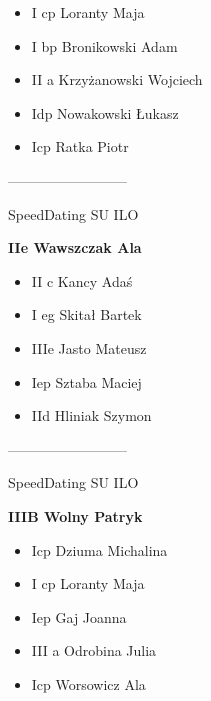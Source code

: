 \documentclass[a4paper,10pt]{article}
\begin{document}
\begin{multicols}{3}
\begin{minipage}[l]{\textwidth}
  \begin{itemize}
    \item I cp Loranty Maja
    \item I bp Bronikowski Adam
    \item II a Krzyżanowski Wojciech
    \item Idp Nowakowski Łukasz
    \item Icp Ratka Piotr

    \end{itemize}



\end{minipage}



\begin{minipage}[l]{\textwidth}
--------------------------

  \footnotesize{SpeedDating SU ILO}

  \bfseries{IIe Wawszczak Ala}

  \begin{itemize}
    \item II c Kancy Adaś
    \item I eg Skitał Bartek
    \item IIIe Jasto Mateusz
    \item Iep Sztaba Maciej
    \item IId Hliniak Szymon

    \end{itemize}



\end{minipage}



\begin{minipage}[l]{\textwidth}
--------------------------

  \footnotesize{SpeedDating SU ILO}

  \bfseries{IIIB Wolny Patryk}

  \begin{itemize}
    \item Icp Dziuma Michalina
    \item I cp Loranty Maja
    \item Iep Gaj Joanna
    \item III a Odrobina Julia
    \item Icp Worsowicz Ala

    \end{itemize}




\end{minipage}
\end{multicols}
\end{document}

